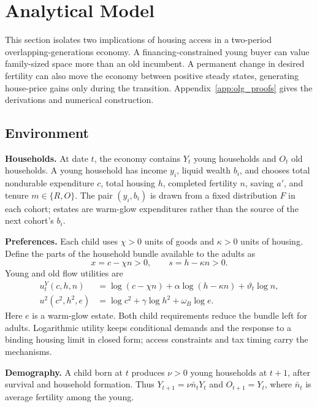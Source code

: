 
\section{Analytical Model}
\label{sec:analytical_model}

This section isolates two implications of housing access in a two-period
overlapping-generations economy.  A financing-constrained young buyer can value
family-sized space more than an old incumbent.  A permanent change in desired
fertility can also move the economy between positive steady states, generating
house-price gains only during the transition.  Appendix~\ref{app:olg_proofs}
gives the derivations and numerical construction.

\subsection{Environment}

\textbf{Households.}
At date $t$, the economy contains $Y_t$ young households and $O_t$ old
households.  A young household has income $y_i$, liquid wealth $b_i$, and
chooses total nondurable expenditure $c$, total housing $h$, completed
fertility $n$, saving $a'$, and tenure $m\in\{R,O\}$.  The pair $(y_i,b_i)$ is
drawn from a fixed distribution $F$ in each cohort; estates are warm-glow
expenditures rather than the source of the next cohort's $b_i$.

\textbf{Preferences.}
Each child uses $\chi>0$ units of goods and $\kappa>0$ units of housing.  Define
the parts of the household bundle available to the adults as
\begin{equation}
 x=c-\chi n>0,\qquad s=h-\kappa n>0.
 \label{eq:olg_usable_bundles}
\end{equation}
Young and old flow utilities are
\begin{align}
 u_t^Y(c,h,n)&=\log(c-\chi n)+\alpha\log(h-\kappa n)
 +\vartheta_t\log n,
 \label{eq:olg_young_utility}\\
 u^2(c^2,h^2,e)&=\log c^2+\gamma\log h^2+\omega_B\log e.
 \label{eq:olg_old_utility}
\end{align}
Here $e$ is a warm-glow estate.  Both child requirements reduce the bundle left
for adults.  Logarithmic utility keeps conditional demands and the response to
a binding housing limit in closed form; access constraints and tax timing carry
the mechanisms.

\textbf{Demography.}
A child born at $t$ produces $\nu>0$ young households at $t+1$, after survival
and household formation.  Thus
$Y_{t+1}=\nu\bar n_tY_t$ and $O_{t+1}=Y_t$, where $\bar n_t$ is average
fertility among the young.

